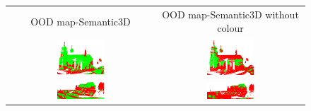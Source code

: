     \begin{figure}[h!]
        \centering
        \begin{tabular}{cc}
            OOD map-Semantic3D & OOD map-Semantic3D without colour \\
            \includegraphics[width=0.33\textwidth, height=0.18\textheight]{images/ood_imgs/sem3d_of/ent/fout_sem3d_OOD_1.pdf}&
            \includegraphics[width=0.33\textwidth, height=0.18\textheight]{images/ood_imgs/sem3d_of/ent/fout_sem3d_of_OOD_1.pdf}\\

            \includegraphics[width=0.33\textwidth, height=0.18\textheight]{images/ood_imgs/sem3d_of/ent/fout_sem3d_OOD_2.pdf}&
            \includegraphics[width=0.33\textwidth, height=0.18\textheight]{images/ood_imgs/sem3d_of/ent/fout_sem3d_of_OOD_2.pdf}\\


\end{tabular}
\end{figure}
